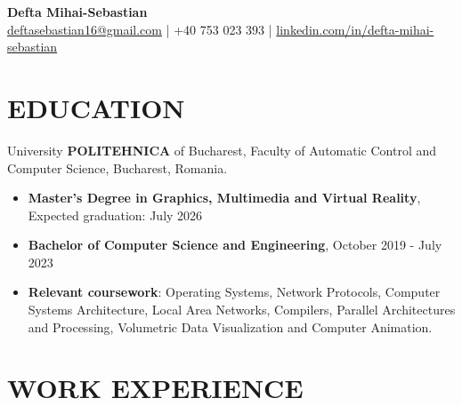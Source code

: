 \documentclass[a4paper,9pt]{extarticle}
\begin{document}
\pagestyle{empty}

\begin{center}
\textbf{\huge Defta Mihai-Sebastian}\\[10pt] %
\href{deftasebastian16@gmail.com}{deftasebastian16@gmail.com} | +40 753 023 393 | \href{https://www.linkedin.com/in/defta-mihai-sebastian}{linkedin.com/in/defta-mihai-sebastian} %
\end{center}

\section*{EDUCATION}
\noindent
University \textbf{POLITEHNICA} of Bucharest, Faculty of Automatic Control and Computer Science, 
Bucharest, Romania.
\begin{itemize}
\item \textbf{Master's Degree in Graphics, Multimedia and Virtual Reality}, Expected graduation: July 2026
\item \textbf{Bachelor of Computer Science and Engineering}, October 2019 - July 2023
\item \textbf{Relevant coursework}: Operating Systems, Network Protocols, Computer Systems Architecture, Local Area Networks, Compilers, Parallel Architectures and Processing, Volumetric Data Visualization and Computer Animation.
\end{itemize} 

\section*{WORK EXPERIENCE}
\end{document}
